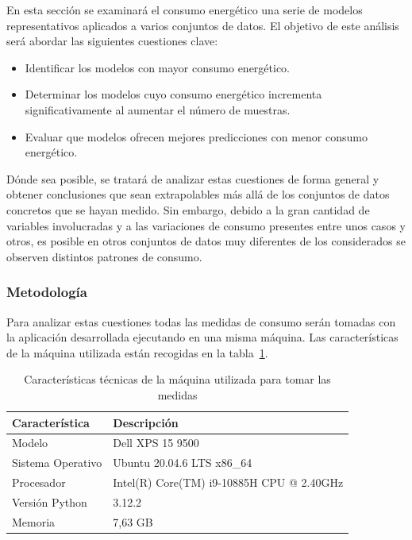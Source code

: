 En esta sección se examinará el consumo energético una serie de modelos representativos aplicados a varios conjuntos de datos. El objetivo de este análisis será abordar las siguientes cuestiones clave:

\begin{itemize}
    \item Identificar los modelos con mayor consumo energético.
    \item Determinar los modelos cuyo consumo energético incrementa significativamente al aumentar el número de muestras.
    \item Evaluar que modelos ofrecen mejores predicciones con menor consumo energético.
\end{itemize}

Dónde sea posible, se tratará de analizar estas cuestiones de forma general y obtener conclusiones que sean extrapolables más allá de los conjuntos de datos concretos que se hayan medido. Sin embargo, debido a la gran cantidad de variables involucradas y a las variaciones de consumo presentes entre unos casos y otros, es posible en otros conjuntos de datos muy diferentes de los considerados se observen distintos patrones de consumo.

\subsubsection{Metodología}

Para analizar estas cuestiones todas las medidas de consumo serán tomadas con la aplicación desarrollada ejecutando en una misma máquina. Las características de la máquina utilizada están recogidas en la tabla~\ref{tab:caracteristicas-tecnicas}.

\begin{table}[h]
    \caption{Características técnicas de la máquina utilizada para tomar las medidas}
    \label{tab:caracteristicas-tecnicas}
    \renewcommand\arraystretch{1.4}
    \centering
    \begin{tabular}{m{} m{}}
        \toprule
         \textbf{Característica} & \textbf{Descripción} \\
         \midrule
         Modelo & Dell XPS 15 9500\\
         Sistema Operativo & Ubuntu 20.04.6 LTS x86\_64\\
         Procesador & Intel(R) Core(TM) i9-10885H CPU @ 2.40GHz\\
         Versión Python & 3.12.2\\
         Memoria & 7,63 GB\\
         \bottomrule
    \end{tabular}
\end{table}

